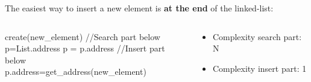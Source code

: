 \documentclass{beamer}[10pt, usepdftitle=false, handout]
\begin{document}
	\begin{frame}
	
	The easiest way to insert a new element is \textbf{at the end} of the linked-list:
	
	\begin{columns}[c]
	\begin{center}    
    \scalebox{0.75} {
    \begin{algorithm}[H]
    create(new\_element)\;
  	\vspace*{1em}
    //Search part below \\  
    p=List.address\;
     {
		p = p.address\;
	}
	\vspace*{1em}
	//Insert part below \\ 
    p.address=get\_address(new\_element)\;
	\end{algorithm}	
	}
	\end{center}
	\begin{center}
	\begin{itemize}
		\item {Complexity search part: N}
		\item {Complexity insert part: 1}
	\end{itemize}	
	\end{center}
	\end{columns}	
	
	\end{frame}	
	
\end{document}
